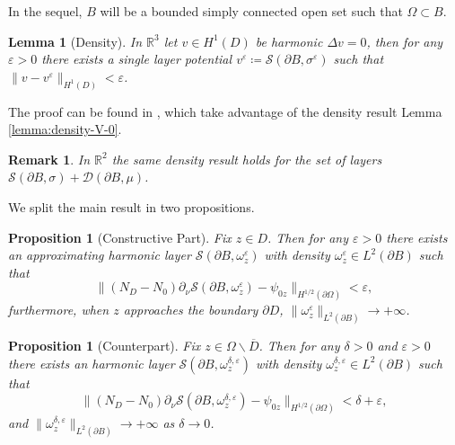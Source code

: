 \documentclass[10pt, a4paper, twoside, openright]{book}
\theoremstyle{definition}
\theoremstyle{plain}
\theoremstyle{plain}
\theoremstyle{plain}
\newtheorem{proposition}[subsection]{Proposition}
\theoremstyle{plain}
\newtheorem{remark}[subsection]{Remark}
\theoremstyle{plain}
\newtheorem{lemma}[subsection]{Lemma}
\theoremstyle{plain}
\theoremstyle{plain}
\theoremstyle{plain}
\let\epsilon\varepsilon
\begin{document}
 In the sequel, $B$ will be a bounded simply connected open set such that $\Omega\subset B$.
\begin{lemma}[Density]
 \label{lemma:lsm-density}
 In $\mathbb{R}^3$ let $v\in H^1(D)$ be harmonic $\Delta v=0$, then for any $\epsilon>0$ there exists 
 a single layer potential $v^\epsilon\coloneqq\mathcal{S}(\partial B, \sigma^\epsilon)$ such that $\|v-v^\epsilon\|_{H^1(D)}<\epsilon$.
\end{lemma}
The proof can be found in \cite{somersalo:preprint}, which take advantage of the density result Lemma \ref{lemma:density-V-0}.
\begin{remark}
 In $\mathbb{R}^2$ the same density result holds for the set of layers $\mathcal{S}(\partial B, \sigma)+ \mathcal{D}(\partial B,\mu)$.
\end{remark}
We split the main result in two propositions.
\begin{proposition}[Constructive Part]
\label{prop:lsm-constructive}
Fix $z \in D$. Then for any $\epsilon > 0$ there exists an approximating harmonic layer $\mathcal{S}(\partial B, \omega^\epsilon_z)$ with density $\omega^\epsilon_z\in L^2(\partial B)$  such that
\begin{equation}
 \|({N_D} - {N_0})\partial_\nu\mathcal{S}(\partial B, \omega^\epsilon_z) - \psi_{0z}\|_{H^{1/2}(\partial\Omega)} < \epsilon,
\end{equation}
furthermore, when $z$ approaches the boundary $\partial D$, $\|\omega^\epsilon_z\|_{L^2(\partial B)}\to + \infty$.
\end{proposition}
\begin{proposition}[Counterpart]
\label{prop:lsm-counterpart}
Fix $z \in \Omega\backslash\overline{D}$. Then for any $\delta>0$ and $\epsilon > 0$ there exists an harmonic layer $\mathcal{S}(\partial B, \omega^{\delta, \epsilon}_z)$ with density $\omega^{\delta, \epsilon}_z\in L^2(\partial B)$ such that
\begin{equation}
 \|({N_D} - {N_0})\partial_\nu\mathcal{S}(\partial B, \omega^{\delta,\epsilon}_z) - \psi_{0z}\|_{H^{1/2}(\partial\Omega)} < \delta + \epsilon,
\end{equation}
and $\|\omega^{\delta, \epsilon}_z\|_{L^2(\partial B)}\to + \infty$ as $\delta\to 0$.
\end{proposition}
\end{document}
